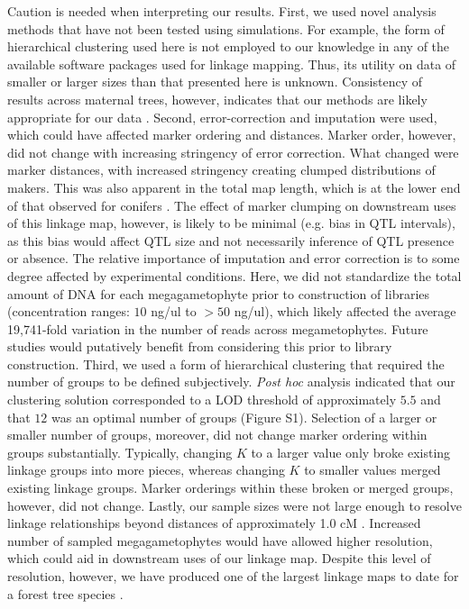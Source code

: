 \documentclass[smallextended]{svjour3}
\begin{document}
Caution is needed when interpreting our results. First, we used novel analysis methods that have not been tested 
using simulations. For example, the form of hierarchical clustering used here is not employed to our knowledge in any 
of the available software packages used for linkage mapping. Thus, its utility on data of smaller or larger sizes than that 
presented here is unknown. Consistency of results across maternal trees, however, indicates that our methods are likely
appropriate for our data \citep[see also][]{Tani:2003}. Second, error-correction and imputation were used, which
could have affected marker ordering and distances. Marker order, however, did not change with increasing stringency of error correction. What changed were marker distances, with 
increased stringency creating clumped distributions of makers. This was also apparent in the total map length, which 
is at the lower end of that observed for conifers \citep[cf.,][]{Ritland:2011}. The effect of marker clumping on downstream uses of 
this  linkage map, however, is likely to be minimal (e.g. bias in QTL intervals), as this bias would affect QTL size and not necessarily
inference of QTL presence or absence. The relative importance of imputation and error correction is to some degree affected by
experimental conditions. Here, we did not standardize the total amount of DNA for each megagametophyte prior to 
construction of libraries (concentration ranges: $10$ ng/ul to $>50$ ng/ul), which likely affected the average 19,741-fold variation
in the number of reads across megametophytes. Future studies would putatively benefit from considering this prior to 
library construction. Third, we used a form of hierarchical clustering
that required the number of groups to be defined subjectively. \textit{Post hoc} analysis indicated that our clustering solution 
corresponded to a LOD threshold of approximately $5.5$ and that $12$ was an optimal number of groups (Figure S1). Selection
of a larger or smaller number of groups, moreover, did not change marker ordering within groups substantially.
Typically, changing $K$ to a larger value only broke existing linkage groups into more pieces, whereas changing $K$ to smaller
values merged existing linkage groups. Marker orderings within these broken or merged groups, however, did not change.
Lastly, our sample sizes were not large enough to resolve linkage relationships beyond distances of approximately 
1.0 cM \citep[but see][]{Neves:2014}. Increased number of sampled megagametophytes 
would have allowed higher resolution, which could aid in downstream uses of our linkage map. Despite this level of 
resolution, however, we have produced one of the largest linkage maps to date for a forest tree species \citep{Eckert:2010b, Martinez-Garcia:2013, Neves:2014}.
\end{document}
